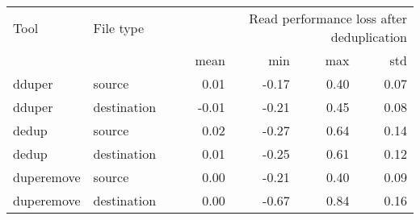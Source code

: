\begin{tabular}{llrrrr}
\toprule
Tool & File type & \multicolumn{4}{r}{Read performance loss after deduplication} \\
 &  & mean & min & max & std \\
\midrule
dduper & source & 0.01 & -0.17 & 0.40 & 0.07 \\
dduper & destination & -0.01 & -0.21 & 0.45 & 0.08 \\
dedup & source & 0.02 & -0.27 & 0.64 & 0.14 \\
dedup & destination & 0.01 & -0.25 & 0.61 & 0.12 \\
duperemove & source & 0.00 & -0.21 & 0.40 & 0.09 \\
duperemove & destination & 0.00 & -0.67 & 0.84 & 0.16 \\
\bottomrule
\end{tabular}
